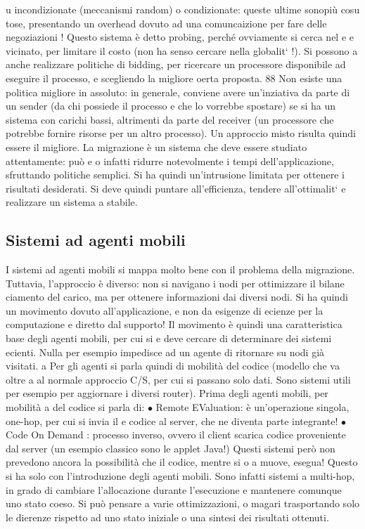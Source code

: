 u
incondizionate (meccanismi random) o condizionate: queste ultime sonopiù cosu
tose, presentando un overhead dovuto ad una comuncaizione per fare delle negoziazioni ! Questo sistema è detto probing,
perché ovviamente si cerca nel
e
e
vicinato, per limitare il costo (non ha senso cercare nella globalit` !). Si possono
a
anche realizzare politiche di bidding, per ricercare un processore disponibile ad
eseguire il processo, e scegliendo la migliore oerta proposta.
88
Non esiste una politica migliore in assoluto: in generale, conviene avere
un'inziativa da parte di un sender (da chi possiede il processo e che lo vorrebbe
spostare) se si ha un sistema con carichi bassi, altrimenti da parte del receiver
(un processore che potrebbe fornire risorse per un altro processo). Un approccio
misto risulta quindi essere il migliore.
La migrazione è un sistema che deve essere studiato attentamente: può
e
o
infatti ridurre notevolmente i tempi dell'applicazione, sfruttando politiche semplici. Si ha quindi un'intrusione
limitata per ottenere i risultati desiderati. Si
deve quindi puntare all'efficienza, tendere all'ottimalit` e realizzare un sistema
a
stabile.
\subsection{Sistemi ad agenti mobili}
I sistemi ad agenti mobili si mappa molto bene con il problema della migrazione.
Tuttavia, l'approccio è diverso: non si navigano i nodi per ottimizzare il bilane
ciamento del carico, ma per ottenere informazioni dai diversi nodi. Si ha quindi
un movimento dovuto all'applicazione, e non da esigenze di ecienze per la
computazione e diretto dal supporto!
Il movimento è quindi una caratteristica base degli agenti mobili, per cui si
e
deve cercare di determinare dei sistemi ecienti. Nulla per esempio impedisce
ad un agente di ritornare su nodi già visitati.
a
Per gli agenti si parla quindi di mobilità del codice (modello che va oltre
a
al normale approccio C/S, per cui si passano solo dati. Sono sistemi utili per
esempio per aggiornare i diversi router). Prima degli agenti mobili, per mobilità
a
del codice si parla di:
$\bullet$ Remote EValuation: è un'operazione singola, one-hop, per cui si invia il
e
codice al server, che ne diventa parte integrante!
$\bullet$ Code On Demand : processo inverso, ovvero il client scarica codice proveniente dal server (un esempio classico
sono le applet Java!)
Questi sistemi però non prevedono ancora la possibilità che il codice, mentre si
o
a
muove, esegua! Questo si ha solo con l'introduzione degli agenti mobili. Sono infatti sistemi a multi-hop, in grado di
cambiare l'allocazione durante l'esecuzione
e mantenere comunque uno stato coeso. Si può pensare a varie ottimizzazioni,
o
magari trasportando solo le dierenze rispetto ad uno stato iniziale o una sintesi
dei risultati ottenuti.
